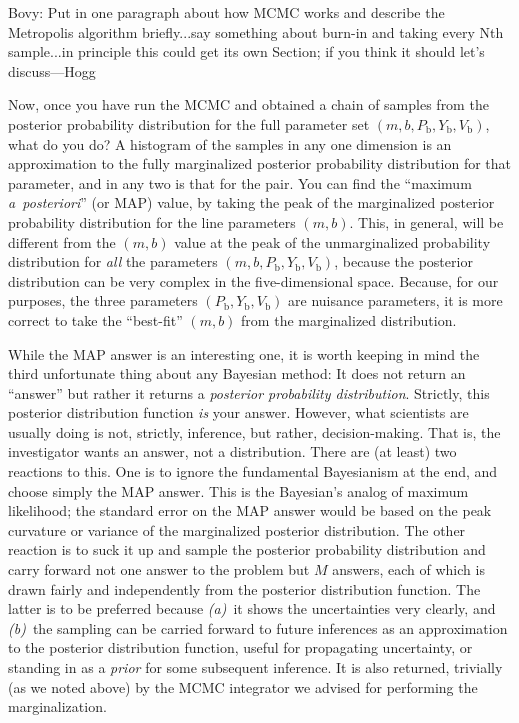 \documentclass[12pt,twoside]{article}
\newcommand{\notenglish}[1]{\textsl{#1}}
\newcommand{\aposteriori}{\notenglish{a~posteriori}}
\newcommand{\sectionname}{Section}
\newcounter{problem}
\newcommand{\Pbad}{P_{\mathrm{b}}}
\newcommand{\Ybad}{Y_{\mathrm{b}}}
\newcommand{\Vbad}{V_{\mathrm{b}}}
\begin{document}
Bovy: Put in one paragraph about how MCMC works and describe the
Metropolis algorithm briefly...say something about burn-in and taking
every Nth sample...in principle this could get its own \sectionname;
if you think it should let's discuss---Hogg

Now, once you have run the MCMC and obtained a chain of samples from
the posterior probability distribution for the full parameter set
$(m,b,\Pbad,\Ybad,\Vbad)$, what do you do?  A histogram of the samples
in any one dimension is an approximation to the fully marginalized
posterior probability distribution for that parameter, and in any two
is that for the pair.  You can find the ``maximum \aposteriori'' (or
MAP) value, by taking the peak of the marginalized posterior
probability distribution for the line parameters $(m,b)$.  This, in
general, will be different from the $(m,b)$ value at the peak of the
unmarginalized probability distribution for \emph{all} the parameters
$(m,b,\Pbad,\Ybad,\Vbad)$, because the posterior distribution can be
very complex in the five-dimensional space.  Because, for our
purposes, the three parameters $(\Pbad,\Ybad,\Vbad)$ are nuisance
parameters, it is more correct to take the ``best-fit'' $(m,b)$ from
the marginalized distribution.

While the MAP answer is an interesting one, it is worth keeping in
mind the third unfortunate thing about any Bayesian method: It does
not return an ``answer'' but rather it returns a \emph{posterior
probability distribution}.  Strictly, this posterior distribution
function \emph{is} your answer.  However, what scientists are usually
doing is not, strictly, inference, but rather, decision-making.  That
is, the investigator wants an answer, not a distribution.  There are
(at least) two reactions to this.  One is to ignore the fundamental
Bayesianism at the end, and choose simply the MAP answer.  This is the
Bayesian's analog of maximum likelihood; the standard error on the MAP
answer would be based on the peak curvature or variance of the
marginalized posterior distribution.  The other reaction is to suck it
up and sample the posterior probability distribution and carry forward
not one answer to the problem but $M$ answers, each of which is drawn
fairly and independently from the posterior distribution function.
The latter is to be preferred because \textsl{(a)}~it shows the
uncertainties very clearly, and \textsl{(b)}~the sampling can be
carried forward to future inferences as an approximation to the
posterior distribution function, useful for propagating uncertainty,
or standing in as a \emph{prior} for some subsequent inference.  It is
also returned, trivially (as we noted above) by the MCMC integrator we
advised for performing the marginalization.
\end{document}
